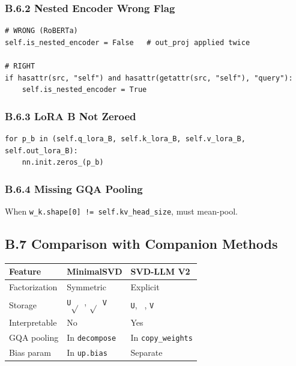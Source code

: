 \subsubsection{B.6.2 Nested Encoder Wrong Flag}

\begin{lstlisting}
# WRONG (RoBERTa)
self.is_nested_encoder = False   # out_proj applied twice

# RIGHT
if hasattr(src, "self") and hasattr(getattr(src, "self"), "query"):
    self.is_nested_encoder = True
\end{lstlisting}

\subsubsection{B.6.3 LoRA B Not Zeroed}

\begin{lstlisting}
for p_b in (self.q_lora_B, self.k_lora_B, self.v_lora_B, self.out_lora_B):
    nn.init.zeros_(p_b)
\end{lstlisting}

\subsubsection{B.6.4 Missing GQA Pooling}

When \texttt{w\_k.shape[0] != self.kv\_head\_size}, must mean-pool.

\subsection{B.7 Comparison with Companion Methods}

\begin{table}[H]
\centering
\small
\begin{tabular}{lll}
\toprule
\textbf{Feature} & \textbf{MinimalSVD} & \textbf{SVD-LLM V2} \\
\midrule
Factorization & Symmetric & Explicit \\
Storage & \texttt{U$\sqrt{}$ }, \texttt{$\sqrt{}$ V} & \texttt{U}, \texttt{ }, \texttt{V} \\
Interpretable & No & Yes \\
GQA pooling & In \texttt{decompose} & In \texttt{copy\_weights} \\
Bias param & In \texttt{up.bias} & Separate \\
\bottomrule
\end{tabular}
\end{table}

